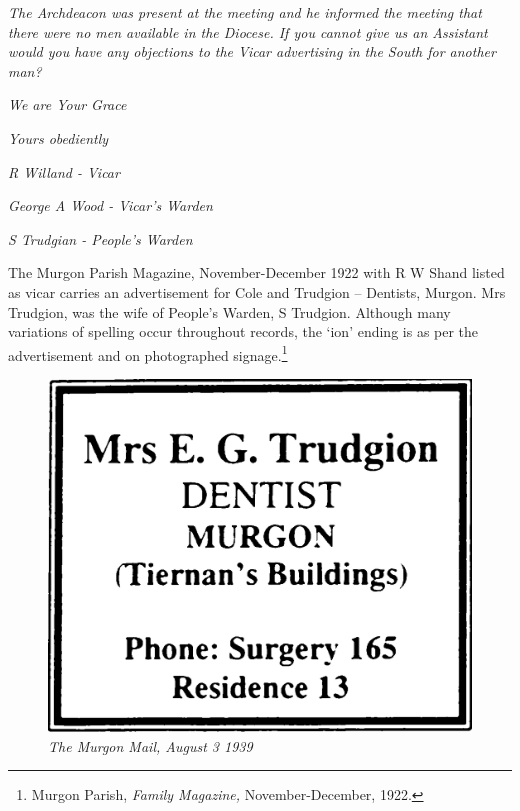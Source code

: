 \emph{The Archdeacon was present at the meeting and he informed the meeting that there were no men available in the Diocese. If you cannot give us an Assistant would you have any objections to the Vicar advertising in the South for another man?}



\emph{We are Your Grace}



\emph{Yours obediently}



\emph{R Willand - Vicar}



\emph{George A Wood - Vicar's Warden}



\emph{S Trudgian - People's Warden}



\smallskip


The Murgon Parish Magazine, November-December 1922 with R W Shand listed as vicar carries an advertisement for Cole and Trudgion -- Dentists, Murgon. Mrs Trudgion, was the wife of People's Warden, S Trudgion. Although many variations of spelling occur throughout records, the `ion' ending is as per the advertisement and on photographed signage.\footnote{Murgon Parish, \emph{Family Magazine,} November-December, 1922.}








\begin{figure}[htb]
\begin{center}
\includegraphics[width=.6\textwidth,center]{../images/trudgionAd.jpg}
\caption{\itshape \emph{The Murgon Mail}, August 3 1939}
\end{center}
\end{figure}




